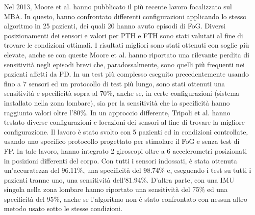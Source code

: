 Nel 2013, Moore et al. hanno pubblicato il più recente lavoro focalizzato sul MBA. In questo, hanno confrontato differenti configurazioni applicando lo stesso algoritmo in 25 pazienti, dei quali 20 hanno avuto episodi di FoG. Diversi posizionamenti dei sensori e valori per PTH e FTH sono stati valutati al fine di trovare le condizioni ottimali. I risultati migliori sono stati ottenuti con soglie più elevate, anche se con queste Moore et al. hanno riportato una rilevante perdita di sensitività negli episodi brevi che, paradossalmente, sono quelli più frequenti nei pazienti affetti da PD\cite{27}. In un test più complesso eseguito precedentemente\cite{20} usando fino a 7 sensori ed un protocollo di test più lungo, sono stati ottenuti una sensitività e specificità sopra al 70\%, anche se, in certe configurazioni (sistema installato nella zona lombare), sia per la sensitività che la specificità hanno raggiunto valori oltre l'80\%. In un approccio differente, Tripoli et al. hanno testato diverse configurazioni e locazioni dei sensori al fine di trovare la migliore configurazione\cite{52}. Il lavoro è stato svolto con 5 pazienti ed in condizioni controllate, usando uno specifico protocollo progettato per stimolare il FoG e senza test di FP. In tale lavoro, hanno integrato 2 giroscopi oltre a 6 accelerometri posizionati in posizioni differenti del corpo. Con tutti i sensori indossati, è stata ottenuta un'accuratezza del 96.11\%, una specificità del 98.74\% e, eseguendo i test su tutti i pazienti tranne uno, una sensitività dell'81.94\%. D'altra parte, con una IMU singola nella zona lombare hanno riportato una sensitività del 75\% ed una specificità del 95\%, anche se l'algoritmo non è stato confrontato con nessun altro metodo usato sotto le stesse condizioni. \newline
